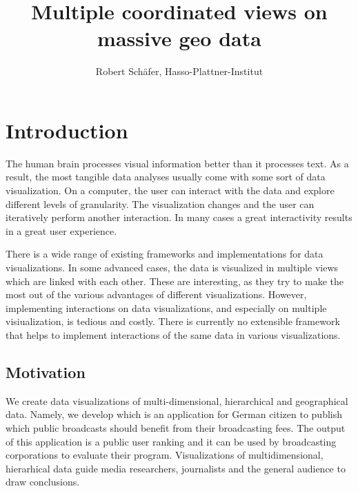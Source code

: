 

\title{Multiple coordinated views on massive geo data}
\author{Robert Schäfer, Hasso-Plattner-Institut}
\maketitle
\clearpage

\tableofcontents
\clearpage



\clearpage

\section{Introduction}
The human brain processes visual information better than it processes text.
As a result, the most tangible data analyses usually come with some sort of data visualization.
On a computer, the user can interact with the data and explore different levels of granularity.
The visualization changes and the user can iteratively perform another interaction.
In many cases a great interactivity results in a great user experience.

There is a wide range of existing frameworks and implementations for data visualizations.
In some advanced cases, the data is visualized in multiple views which are linked with each other.
These \cmvs{} are interesting, as they try to make the most out of the various advantages of different visualizations.
However, implementing interactions on data visualizations, and especially on multiple visiualization, is tedious and costly.
There is currently no extensible framework that helps to implement interactions of the same data in various visualizations.


\subsection{Motivation}\label{sec:outline}

We create data visualizations of multi-dimensional, hierarchical and geographical data.
Namely, we develop \rufu{} which is an application for German citizen to publish which public broadcasts should benefit from their broadcasting fees.
The output of this application is a public user ranking and it can be used by broadcasting corporations to evaluate their program.
Visualizations of multidimensional, hierarhical data guide media researchers, journalists and the general audience to draw conclusions.

